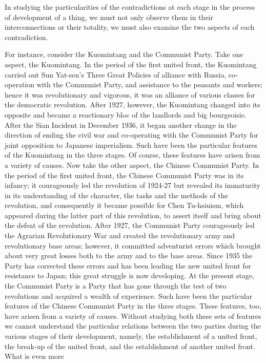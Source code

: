 \documentclass{article}
\begin{document}
In studying the particularities of the contradictions at each stage in the
process of development of a thing, we must not only observe them in their
interconnections or their totality, we must also examine the two aspects of
each contradiction.

For instance, consider the Kuomintang and the Communist Party. Take one aspect,
the Kuomintang. In the period of the first united front, the Kuomintang carried
out Sun Yat-sen's Three Great Policies of alliance with Russia, co-operation
with the Communist Party, and assistance to the peasants and workers; hence it
was revolutionary and vigorous, it was an alliance of various classes for the
democratic revolution. After 1927, however, the Kuomintang changed into its
opposite and became a reactionary bloc of the landlords and big bourgeoisie.
After the Sian Incident in December 1936, it began another change in the
direction of ending the civil war and co-operating with the Communist Party for
joint opposition to Japanese imperialism. Such have been the particular
features of the Kuomintang in the three stages. Of course, these features have
arisen from a variety of causes. Now take the other aspect, the Chinese
Communist Party. In the period of the first united front, the Chinese Communist
Party was in its infancy; it courageously led the revolution of 1924-27 but
revealed its immaturity in its understanding of the character, the tasks and
the methods of the revolution, and consequently it became possible for Chen
Tu-hsiuism, which appeared during the latter part of this revolution, to assert
itself and bring about the defeat of the revolution. After 1927, the Communist
Party courageously led the Agrarian Revolutionary War and created the
revolutionary army and revolutionary base areas; however, it committed
adventurist errors which brought about very great losses both to the army and
to the base areas. Since 1935 the Party has corrected these errors and has been
leading the new united front for resistance to Japan; this great struggle is
now developing. At the present stage, the Communist Party is a Party that has
gone through the test of two revolutions and acquired a wealth of experience.
Such have been the particular features of the Chinese Communist Party in the
three stages. These features, too, have arisen from a variety of causes.
Without studying both these sets of features we cannot understand the
particular relations between the two parties during the various stages of their
development, namely, the establishment of a united front, the break-up of the
united front, and the establishment of another united front. What is even more
\end{document}
